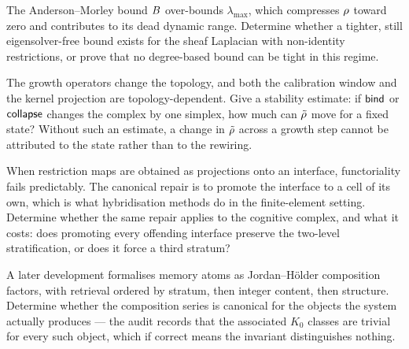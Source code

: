 \begin{openproblem}\label{op:normaliser}
The Anderson--Morley bound $B$ over-bounds $\lambda_{\max}$, which
compresses $\rho$ toward zero and contributes to its dead dynamic
range. Determine whether a tighter, still eigensolver-free bound exists
for the sheaf Laplacian with non-identity restrictions, or prove that no
degree-based bound can be tight in this regime.
\end{openproblem}

\begin{openproblem}\label{op:stability}
The growth operators change the topology, and both the calibration
window and the kernel projection are topology-dependent. Give a
stability estimate: if $\mathsf{bind}$ or $\mathsf{collapse}$ changes the complex by
one simplex, how much can $\tilde{\rho}$ move for a fixed state? Without such
an estimate, a change in $\tilde{\rho}$ across a growth step cannot be
attributed to the state rather than to the rewiring.
\end{openproblem}

\begin{openproblem}\label{op:hybrid}
When restriction maps are obtained as projections onto an interface,
functoriality fails predictably. The canonical repair is to promote the
interface to a cell of its own, which is what hybridisation methods do in
the finite-element setting. Determine whether the same repair applies to
the cognitive complex, and what it costs: does promoting every offending
interface preserve the two-level stratification, or does it force a third
stratum?
\end{openproblem}

\begin{openproblem}\label{op:jordanholder}
A later development formalises memory atoms as Jordan--H\"older
composition factors, with retrieval ordered by stratum, then integer
content, then structure. Determine whether the composition series is
canonical for the objects the system actually produces --- the audit
records that the associated $K_0$ classes are trivial for every such
object, which if correct means the invariant distinguishes nothing.
\end{openproblem}
